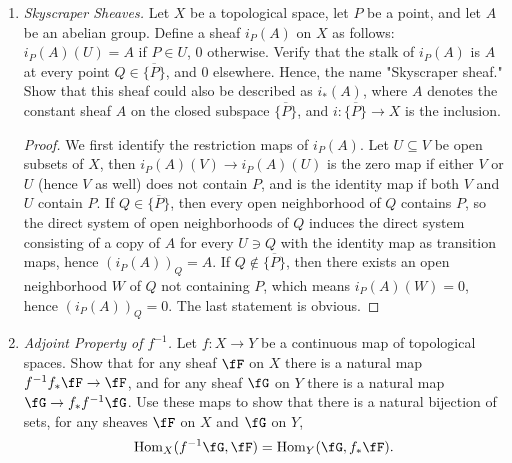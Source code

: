 \documentclass[a4paper]{article}
\begin{document}
\begin{enumerate} [label=\textbf{\arabic*.}, leftmargin=0em]
    \item[\textbf{17.}] \textit{Skyscraper Sheaves.} Let $X$ be a topological space, let $P$ be a point, and let $A$ be an abelian group. Define a sheaf $i_P(A)$ on $X$ as follows: $i_P(A)(U) = A$ if $P\in U$, $0$ otherwise. Verify that the stalk of $i_P(A)$ is $A$ at every point $Q \in \overline{\{ P \}}$, and $0$ elsewhere. Hence, the name "Skyscraper sheaf." Show that this sheaf could also be described as $i_*(A)$, where $A$ denotes the constant sheaf $A$ on the closed subspace $\overline{\{ P \}}$, and $i : \overline{\{ P \}} \to X$ is the inclusion.

          \begin{proof}
              We first identify the restriction maps of $i_P(A)$. Let $U \subseteq V$ be open subsets of $X$, then $i_P(A)(V) \to i_P(A)(U)$ is the zero map if either $V$ or $U$ (hence $V$ as well) does not contain $P$, and is the identity map if both $V$ and $U$ contain $P$. If $Q \in \overline{\{ P \} }$, then every open neighborhood of $Q$ contains $P$, so the direct system of open neighborhoods of $Q$ induces the direct system consisting of a copy of $A$ for every $U \ni Q$ with the identity map as transition maps, hence $(i_P(A))_Q = A$. If $Q \notin \overline{\{P \} }$, then there exists an open neighborhood $W$ of $Q$ not containing $P$, which means $i_P(A)(W) = 0$, hence $(i_P(A))_Q = 0$. The last statement is obvious.
          \end{proof}

    \item[\textbf{18.}] \textit{Adjoint Property of $f^{-1}$.} Let $f : X \to Y$ be a continuous map of topological spaces. Show that for any sheaf $\fF$ on $X$ there is a natural map $f^{-1} f_* \fF \to \fF$, and for any sheaf $\fG$ on $Y$ there is a natural map $\fG \to f_* f^{-1} \fG$. Use these maps to show that there is a natural bijection of sets, for any sheaves $\fF$ on $X$ and $\fG$ on $Y$,
          \begin{equation*}
              \Hom_X(f^{-1}\fG, \fF) = \Hom_Y(\fG, f_*\fF).
          \end{equation*}


\end{enumerate}
\end{document}
